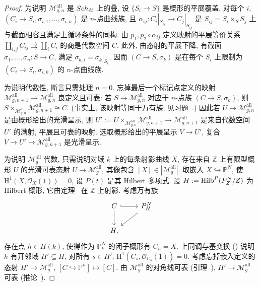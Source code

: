 \begin{proof}
为说明 $\mathcal M_{g,\allowbreak n}^{\mathrm{all}}$ 是 $Sch_{\acute et}$ 上的叠, 设 $\{S_i\to\allowbreak S\}$ 是概形的平展覆盖, 对每个 $i$, $(C_i\to\allowbreak S_i,\allowbreak \sigma_{i,\allowbreak 1},\allowbreak \ldots,\allowbreak \sigma_{i,\allowbreak n})$ 是 $n$-点曲线族, 且 $\alpha_{ij}:C_i|_{S_{ij}}\to\allowbreak C_j|_{S_{ij}}$ 是 $S_{ij}=S_i\times_S S_j$ 上与截面相容且满足上循环条件的同构. 由 $p_1,\allowbreak p_2\circ\alpha_{ij}$ 定义映射的平展等价关系 $\coprod_{i,\allowbreak j}C_{ij}\rightrightarrows\coprod_i C_i$ 的商是代数空间 $C$. 此外, 由态射的平展下降, 有截面 $\sigma_1,\allowbreak \ldots,\allowbreak \sigma_n:S\to\allowbreak C$, 满足 $\sigma_{k,\allowbreak i}=\sigma_k|_{S_i}$. 因而 $(C\to\allowbreak S,\allowbreak \sigma_k)$ 是在每个 $S_i$ 上限制为 $(C_i\to\allowbreak S_i,\allowbreak \sigma_{i,\allowbreak k})$ 的 $n$-点曲线族.

为说明代数性, 断言只需处理 $n=0$. 忘掉最后一个标记点定义的映射 $\mathcal M_{g,\allowbreak n+1}^{\mathrm{all}}\to\mathcal M_{g,\allowbreak n}^{\mathrm{all}}$ 良定义且可表: 若 $S\to\mathcal M_{g,\allowbreak n}^{\mathrm{all}}$ 对应于 $n$-点族 $(C\to\allowbreak S,\allowbreak \sigma_k)$, 则 $S\times_{\mathcal M_{g,\allowbreak n}^{\mathrm{all}}}\mathcal M_{g,\allowbreak n+1}^{\mathrm{all}}\cong C$. (事实上, 该映射等同于万有族; 见习题~.) 因此若 $U\to\mathcal M_{g,\allowbreak n}^{\mathrm{all}}$ 是由概形给出的光滑呈示, 则 $U':=U\times_{\mathcal M_{g,\allowbreak n}^{\mathrm{all}}}\mathcal M_{g,\allowbreak n+1}^{\mathrm{all}}\to\mathcal M_{g,\allowbreak n+1}^{\mathrm{all}}$ 是来自代数空间 $U'$ 的满射, 平展且可表的映射. 选取概形给出的平展呈示 $V\to\allowbreak U'$, 复合 $V\to\allowbreak U'\to\mathcal M_{g,\allowbreak n+1}^{\mathrm{all}}$ 是光滑呈示.

为说明 $\mathcal M_g^{\mathrm{all}}$ 代数, 只需说明对域 $k$ 上的每条射影曲线 $X$, 存在来自 $\mathbb Z$ 上有限型概形 $U$ 的光滑可表态射 $U\to\mathcal M_g^{\mathrm{all}}$, 其像包含 $[X]\in|\mathcal M_g^{\mathrm{all}}|$. 取嵌入 $X\hookrightarrow\mathbb P^N$, 使 $\mathrm H^1(X,\allowbreak \mathcal O_X(1))=0$, 设 $P(t)$ 是其 Hilbert 多项式. 设 $H:=\operatorname{Hilb}^P(P^N_{Z}/Z)$ 为 Hilbert 概形, 它由定理~ 在 $\mathbb Z$ 上射影. 考虑万有族
\[
\begin{tikzcd}
C\arrow[r,hook]\arrow[d]&\mathbb P^N_H\arrow[dl]\\
H,&
\end{tikzcd}
\]
存在点 $h\in H(k)$, 使得作为 $\mathbb P^N_k$ 的闭子概形有 $C_h=X$. 上同调与基变换 () 说明 $h$ 有开邻域 $H'\subseteq H$, 对所有 $s\in H'$, $\mathrm H^1(C_s,\allowbreak \mathcal O_{C_s}(1))=0$. 考虑忘掉嵌入定义的态射 $H'\to\mathcal M_g^{\mathrm{all}}$, $[C\hookrightarrow\mathbb P^n]\mapsto[C]$. 由 $\mathcal M_g^{\mathrm{all}}$ 的对角线可表 (引理~), $H'\to\mathcal M_g^{\mathrm{all}}$ 可表 (推论~).


\end{proof}
